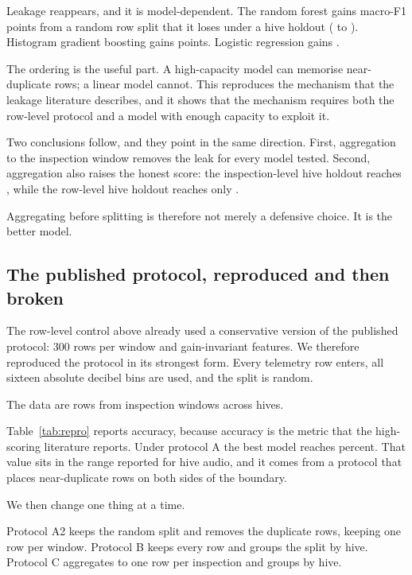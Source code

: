﻿\documentclass[review,12pt]{elsarticle}
\begin{document}
Leakage reappears, and it is model-dependent.
The random forest gains \LeakRowsGapRandomForestPts{} macro-F1 points from a
random row split that it loses under a hive holdout
(\LeakRowsPzeroRandomForestMacroFone{} to
\LeakRowsPtwoRandomForestMacroFone{}).
Histogram gradient boosting gains \LeakRowsGapHistGradientBoostingPts{} points.
Logistic regression gains \LeakRowsGapLogisticRegressionPts{}.

The ordering is the useful part.
A high-capacity model can memorise near-duplicate rows; a linear model cannot.
This reproduces the mechanism that the leakage literature describes, and it
shows that the mechanism requires both the row-level protocol and a model with
enough capacity to exploit it.

Two conclusions follow, and they point in the same direction.
First, aggregation to the inspection window removes the leak for every model
tested.
Second, aggregation also raises the honest score: the inspection-level hive
holdout reaches \LeakBandsPtwoHistGradientBoostingMacroFone{}, while the
row-level hive holdout reaches only
\LeakRowsPtwoHistGradientBoostingMacroFone{}.

Aggregating before splitting is therefore not merely a defensive choice.
It is the better model.

\subsection{The published protocol, reproduced and then broken}
\label{sec:repro-results}

The row-level control above already used a conservative version of the
published protocol: 300 rows per window and gain-invariant features.
We therefore reproduced the protocol in its strongest form.
Every telemetry row enters, all sixteen absolute decibel bins are used, and the
split is random.

The data are \LeakReproNRows{} rows from \LeakReproNWindows{} inspection windows
across \LeakReproNHives{} hives.

Table~\ref{tab:repro} reports accuracy, because accuracy is the metric that the
high-scoring literature reports.
Under protocol A the best model reaches \LeakReproBestAAccuracy{} percent.
That value sits in the range reported for hive audio, and it comes from a
protocol that places near-duplicate rows on both sides of the boundary.

We then change one thing at a time.

Protocol A2 keeps the random split and removes the duplicate rows, keeping one
row per window.
Protocol B keeps every row and groups the split by hive.
Protocol C aggregates to one row per inspection and groups by hive.
\end{document}

